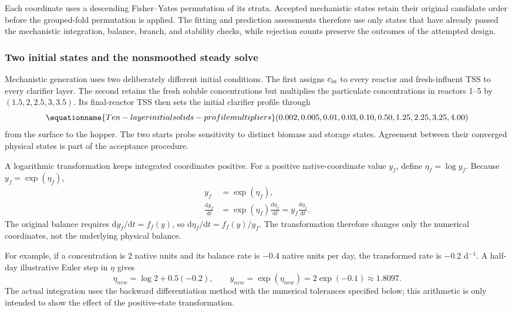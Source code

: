Each coordinate uses a descending Fisher--Yates permutation of its strata. Accepted mechanistic states retain their original candidate order before the grouped-fold permutation is applied. The fitting and prediction assessments therefore use only states that have already passed the mechanistic integration, balance, branch, and stability checks, while rejection counts preserve the outcomes of the attempted design.

\subsubsection{Two initial states and the nonsmoothed steady solve}

Mechanistic generation uses two deliberately different initial conditions. The first assigns $c_{\rm in}$ to every reactor and fresh-influent TSS to every clarifier layer. The second retains the fresh soluble concentrations but multiplies the particulate concentrations in reactors 1--5 by $(1.5,2,2.5,3,3.5)$. Its final-reactor TSS then sets the initial clarifier profile through
\begin{equation}
\equationname{Ten-layer initial solids-profile multipliers}
(0.002,0.005,0.01,0.03,0.10,0.50,1.25,2.25,3.25,4.00)
\label{eq:plant_initial_layer_multipliers}
\end{equation}
from the surface to the hopper. The two starts probe sensitivity to distinct biomass and storage states. Agreement between their converged physical states is part of the acceptance procedure.

A logarithmic transformation keeps integrated coordinates positive. For a positive native-coordinate value $y_f$, define $\eta_f=\log y_f$. Because $y_f=\exp(\eta_f)$,
\[
\begin{aligned}
y_f&=\exp(\eta_f),\\
\frac{\mathrm d y_f}{\mathrm dt}
&=\exp(\eta_f)\frac{\mathrm d\eta_f}{\mathrm dt}
=y_f\frac{\mathrm d\eta_f}{\mathrm dt}.
\end{aligned}
\]
The original balance requires $\mathrm d y_f/\mathrm dt=f_f(y)$, so
$\mathrm d\eta_f/\mathrm dt=f_f(y)/y_f$. The transformation therefore changes only the numerical coordinates, not the underlying physical balance.

For example, if a concentration is 2 native units and its balance rate is $-0.4$ native units per day, the transformed rate is $-0.2$ d$^{-1}$. A half-day illustrative Euler step in $\eta$ gives
\[
\eta_{new}=\log2+0.5(-0.2),\qquad
y_{new}=\exp(\eta_{new})=2\exp(-0.1)\approx1.8097.
\]
The actual integration uses the backward differentiation method with the numerical tolerances specified below; this arithmetic is only intended to show the effect of the positive-state transformation.

